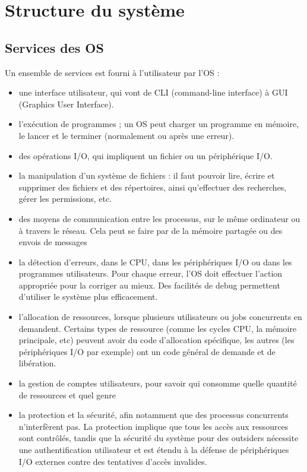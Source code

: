 \chapter{Structure du système}

\section{Services des OS}

Un ensemble de services est fourni à l'utilisateur par l'OS :

\begin{itemize}
	\item une interface utilisateur, qui vont de CLI (command-line interface) à GUI (Graphics User Interface).
	\item l'exécution de programmes ; un OS peut charger un programme en mémoire, le lancer et le terminer (normalement ou après une erreur).
	\item des opérations I/O, qui impliquent un fichier ou un périphérique I/O.
	\item la manipulation d'un système de fichiers : il faut pouvoir lire, écrire et supprimer des fichiers et des répertoires, ainsi qu'effectuer des recherches, gérer les permissions, etc.
	\item des moyens de communication entre les processus, sur le même ordinateur ou à travers le réseau. Cela peut se faire par de la mémoire partagée ou des envois de messages
	\item la détection d'erreurs, dans le CPU, dans les périphériques I/O ou dans les programmes utilisateurs. Pour chaque erreur, l'OS doit effectuer l'action appropriée pour la corriger au mieux. Des facilités de debug permettent d'utiliser le système plus efficacement.
	
	\item l'allocation de ressources, lorsque plusieurs utilisateurs ou jobs concurrents en demandent. Certains types de ressource (comme les cycles CPU, la mémoire principale, etc) peuvent avoir du code d'allocation spécifique, les autres (les périphériques I/O par exemple) ont un code général de demande et de libération.
	\item la gestion de comptes utilisateurs, pour savoir qui consomme quelle quantité de ressources et quel genre
	\item la protection et la sécurité, afin notamment que des processus concurrents n'interfèrent pas. La protection implique que tous les accès aux ressources sont contrôlés, tandis que la sécurité du système pour des outsiders nécessite une authentification utilisateur et est étendu à la défense de périphériques I/O externes contre des tentatives d'accès invalides.
\end{itemize}

